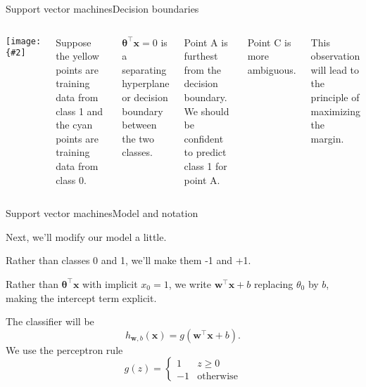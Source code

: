 \documentclass{beamer}
\renewcommand{\vec}[1]{\boldsymbol{#1}}
\newcommand{\myfig}[3]{\centerline{\texttt{[image: \{\#2]}}}
    \centerline{\scriptsize #3}}
\begin{document}
\begin{frame}{Support vector machines}{Decision boundaries}

  \begin{columns}

    \column{2.2in}
    
    \myfig{2in}{classes}{}

    \column{2.3in}

    Suppose the yellow points are training data from class 1 and the
    cyan points are training data from class 0.

    \medskip

    $\vec{\theta}^\top \vec{x} = 0$ is a \alert{separating hyperplane}
    or \alert{decision boundary} between the two classes.

    \medskip

    Point A is furthest from the decision boundary.  We should be
    confident to predict class 1 for point A.

    \medskip

    Point C is more ambiguous.

    \medskip

    This observation will lead to the principle of maximizing the margin.

  \end{columns}
  
\end{frame}


\begin{frame}{Support vector machines}{Model and notation}

  Next, we'll modify our model a little.

  \medskip

  Rather than classes 0 and 1, we'll make them -1 and +1.

  \medskip

  Rather than $\vec{\theta}^\top \vec{x}$ with implicit $x_0 = 1$, we
  write $\vec{w}^\top\vec{x} + b$ replacing $\theta_0$ by $b$, making
  the intercept term explicit.

  \medskip

  The classifier will be
  \[ h_{\vec{w},b}(\vec{x}) = g(\vec{w}^\top\vec{x}+b) .\]
  We use the perceptron rule
  \[ g(z) = \begin{cases} 1 & z \ge 0 \\ -1 & \text{otherwise} \end{cases} \]

\end{frame}
\end{document}
